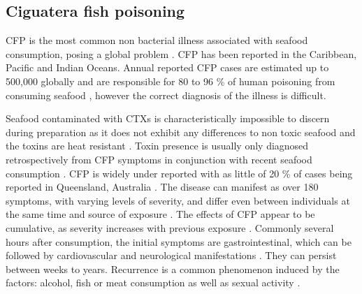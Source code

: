 \documentclass[12pt]{article}
\begin{document}
\subsection{Ciguatera fish poisoning}
CFP is the most common non bacterial illness associated with seafood consumption, posing a global problem \cite{friedman2008ciguatera}. CFP has been reported in the Caribbean, Pacific and Indian Oceans. %
Annual reported CFP cases are estimated up to 500,000 globally and are responsible for 80 to 96 \% of human poisoning from consuming seafood \cite{fleming1998seafood,grandjean2008centers}, however the correct diagnosis of the illness is difficult. 

Seafood contaminated with CTXs is characteristically impossible to discern during preparation as it does not exhibit any differences to non toxic seafood and the toxins are heat resistant \cite{withers1982ciguatera}. Toxin presence is usually only diagnosed retrospectively from CFP symptoms in conjunction with recent seafood consumption \cite{sims1987theoretical}. CFP is widely under reported with as little of 20 \% of cases being reported  in Queensland, Australia \cite{lewis2006ciguatera}. The disease can manifest as over 180 symptoms, with varying levels of severity, and differ even between individuals at the same time and source of exposure \cite{sims1987theoretical}. The effects of CFP appear to be cumulative, as severity increases with previous exposure \cite{emerson1983preliminary}. Commonly several hours after consumption, the initial symptoms are gastrointestinal, which can be followed by cardiovascular and neurological manifestations \cite{sims1987theoretical}. They can persist between weeks to years. Recurrence is a common phenomenon induced by the factors: alcohol, fish or meat consumption \cite{lewis2006ciguatera} as well as sexual activity \cite{lange1992travel}. \\
\end{document}
